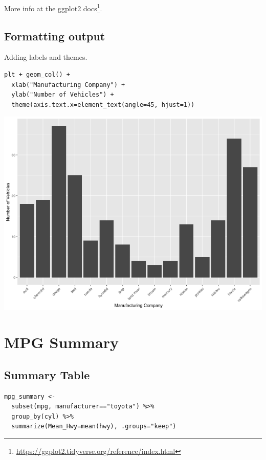 \documentclass[11pt]{article}
\begin{document}
More info at the ggplot2 docs\footnote{\url{https://ggplot2.tidyverse.org/reference/index.html}}.

\subsection{Formatting output}
\label{sec:org8efb858}

Adding labels and themes.

\begin{verbatim}
plt + geom_col() +
  xlab("Manufacturing Company") +
  ylab("Number of Vehicles") +
  theme(axis.text.x=element_text(angle=45, hjust=1))
\end{verbatim}

\begin{org}
\begin{center}
\includegraphics[width=.9\linewidth]{./resources/mpg3.png}
\end{center}
\end{org}

\section{MPG Summary}
\label{sec:org5770c54}

\subsection{Summary Table}
\label{sec:org4abd7cb}

\begin{verbatim}
mpg_summary <-
  subset(mpg, manufacturer=="toyota") %>%
  group_by(cyl) %>%
  summarize(Mean_Hwy=mean(hwy), .groups="keep")
\end{verbatim}
\end{document}
